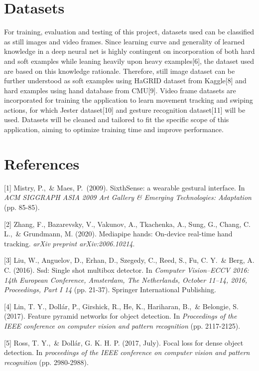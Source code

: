 \documentclass{article}
\begin{document}
\section{Datasets}
For training, evaluation and testing of this project, datasets used can be classified as still images and video frames. Since learning curve and generality of learned knowledge in a deep neural net is highly contingent on incorporation of  both hard and soft examples while leaning heavily upon heavy examples[6], the dataset used are based on this knowledge rationale. Therefore, still image dataset can be further understood as soft examples using HaGRID dataset from Kaggle[8] and hard examples using hand database from CMU[9]. Video frame datasets are incorporated for training the application to learn movement tracking and swiping actions, for which Jester dataset[10] and gesture recognition dataset[11] will be used. Datasets will be cleaned and tailored to fit the specific scope of this application, aiming to optimize training time and improve performance.

\section*{References}

\small

[1] Mistry, P.,\ \& Maes, P.\ (2009). SixthSense: a wearable gestural interface. In {\it ACM SIGGRAPH ASIA 2009 Art Gallery \& Emerging Technologies: Adaptation} (pp. 85-85).

[2] Zhang, F., Bazarevsky, V., Vakunov, A., Tkachenka, A., Sung, G., Chang, C. L.,\  \& Grundmann, M. (2020). Mediapipe hands: On-device real-time hand tracking. {\it arXiv preprint arXiv:2006.10214}.

[3] Liu, W., Anguelov, D., Erhan, D., Szegedy, C., Reed, S., Fu, C. Y.\, \& Berg, A. C. (2016). Ssd: Single shot multibox detector. In {\it Computer Vision–ECCV 2016: 14th European Conference, Amsterdam, The Netherlands, October 11–14, 2016, Proceedings, Part I 14} (pp. 21-37). Springer International Publishing.

[4] Lin, T. Y., Dollár, P., Girshick, R., He, K., Hariharan, B.,\ \& Belongie, S. (2017). Feature pyramid networks for object detection. In {\it Proceedings of the IEEE conference on computer vision and pattern recognition} (pp. 2117-2125).

[5] Ross, T. Y.,\ \& Dollár, G. K. H. P. (2017, July). Focal loss for dense object detection. In {\it proceedings of the IEEE conference on computer vision and pattern recognition} (pp. 2980-2988).
\end{document}
